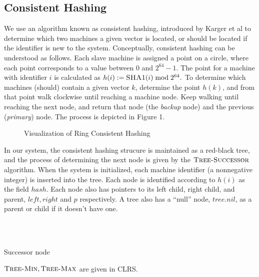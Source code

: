 \subsection{Consistent Hashing}
We use an algorithm known as consistent hashing, introduced by Karger et al \cite{karger1997} to determine which two machines a given vector is located, or
should be located if the identifier is new to the system.
Conceptually, consistent hashing can be understood as follows. Each slave machine is assigned a point on a circle, where each point
corresponds to a value between $0$ and $2^{64}-1.$ The point for a machine with identifier $i$ is calculated as $h(i):=\textsc{SHA1}(i)\bmod 2^{64}.$ To determine which machines (should) contain a given vector $k$, determine the point $h(k)$, and from that point walk clockwise until reaching a machine node. Keep walking until reaching the next node, and return that node (the \emph{backup} node) and the previous (\emph{primary}) node. The process is depicted in Figure 1.
\begin{figure}
    \centering
    
    \caption{Visualization of Ring Consistent Hashing}
\end{figure}
In our system, the consistent hashing strucure is maintained as a red-black tree, and the process of determining the next node is given by the $\textsc{Tree-Successor}$ algorithm. When the system is initialized,
each machine identifier (a nonnegative integer) is inserted into the tree. Each node is identified according to $h(i)$ as the field $hash$. Each node also has pointers to its left child, right child, and parent, $left, right$ and $p$ respectively.
A tree also has a ``null'' node, $tree.nil$, as a parent or child if it doesn't have one.
\begin{algorithm}
    \begin{algorithmic}
      \\
      \Else\\
      \EndIf
    \end{algorithmic}
\caption{Successor node}
\end{algorithm}
$\textsc{Tree-Min},\textsc{Tree-Max}$ are given in CLRS.
